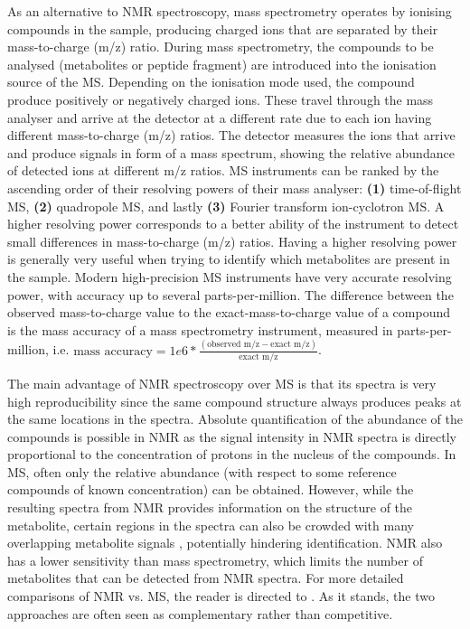 As an alternative to NMR spectroscopy, mass spectrometry operates by ionising compounds in the sample, producing charged ions that are separated by their mass-to-charge (m/z) ratio. During mass spectrometry, the compounds to be analysed (metabolites or peptide fragment) are introduced into the ionisation source of the MS. Depending on the ionisation mode used, the compound produce positively or negatively charged ions. These travel through the mass analyser and arrive at the detector at a different rate due to each ion having different mass-to-charge (m/z) ratios. The detector measures the ions that arrive and produce signals in form of a mass spectrum, showing the relative abundance of detected ions at different m/z ratios. MS instruments can be ranked by the ascending order of their resolving powers of their mass analyser: \textbf{(1)} time-of-flight MS, \textbf{(2)} quadropole MS, and lastly \textbf{(3)} Fourier transform ion-cyclotron MS. A higher resolving power corresponds to a better ability of the instrument to detect small differences in mass-to-charge (m/z) ratios. Having a higher resolving power is generally very useful when trying to identify which metabolites are present in the sample. Modern high-precision MS instruments have very accurate resolving power, with accuracy up to several parts-per-million. The difference between the observed mass-to-charge value to the exact-mass-to-charge value of a compound is the mass accuracy of a mass spectrometry instrument, measured in parts-per-million, i.e. $\text{mass accuracy} = 1e6 * \frac{(\text{observed m/z} - \text{exact m/z})}{\text{exact m/z}}$. 

The main advantage of NMR spectroscopy over MS is that its spectra is very high reproducibility since the same compound structure always produces peaks at the same locations in the spectra. Absolute quantification of the abundance of the compounds is possible in NMR as the signal intensity in NMR spectra is directly proportional to the concentration of protons in the nucleus of the compounds. In MS, often only the relative abundance (with respect to some reference compounds of known concentration) can be obtained. However, while the resulting spectra from NMR provides information on the structure of the metabolite, certain regions in the spectra can also be crowded with many overlapping metabolite signals \cite{Pan2007}, potentially hindering identification. NMR also has a lower sensitivity than mass spectrometry, which limits the number of metabolites that can be detected from NMR spectra. For more detailed comparisons of NMR vs. MS, the reader is directed to \cite{Pan2007}. As it stands, the two approaches are often seen as complementary rather than competitive.


